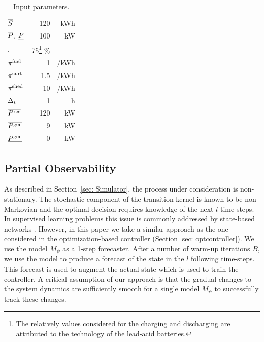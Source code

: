 \documentclass{article}
\begin{document}
\begin{table}
	\begin{center}
		\renewcommand\arraystretch{1}
		\caption{Input parameters.}
		\begin{tabular}[b]{l r r}
			\hline
			$\overline{S}$ & 120 & kWh \\
			$\overline{P}$, $\underline{P}$ & 100 & kW \\
			\chargeEfficienty, \dischargeEfficienty & 75\footnote{The relatively values considered for the charging and discharging are attributed to the technology of the lead-acid batteries.} \% \\ 
			$\pi^{\text{fuel}}$ & 1 & \texteuro/kWh\\
			$\pi^{\text{curt}}$ & 1.5 & \texteuro/kWh \\
			$\pi^{\text{shed}}$ & 10 & \texteuro/kWh \\
			$\Delta_t$ & 1 & h\\
			$\overline{P^\text{res}}$ & 120 & kW \\
			$\overline{P^\text{gen}}$ & 9 & kW \\
			$\underline{P^\text{gen}}$ & 0 & kW \\
			\hline
		\end{tabular}
		\label{input_param}
	\end{center}
\end{table}

	\subsection{Partial Observability}
	    As described in Section~\ref{sec: Simulator}, the process under consideration is non-stationary. The stochastic component of the transition kernel is known to be non-Markovian and the optimal decision requires knowledge of the next $l$ time steps. In supervised learning problems this issue is commonly addressed by state-based networks \cite{taylor2018forecasting}. However, in this paper we take a similar approach as the one considered in the optimization-based controller (Section \ref{sec: optcontroller}). We use the model $M_\psi$ as a 1-step forecaster. After a number of warm-up iterations $B$, we use the model to produce a forecast of the state in the $l$ following time-steps. This forecast is used to augment the actual state which is used to train the controller. A critical assumption of our approach is that the gradual changes to the system dynamics are sufficiently smooth for a single model $M_\psi$ to successfully track these changes.
\end{document}
